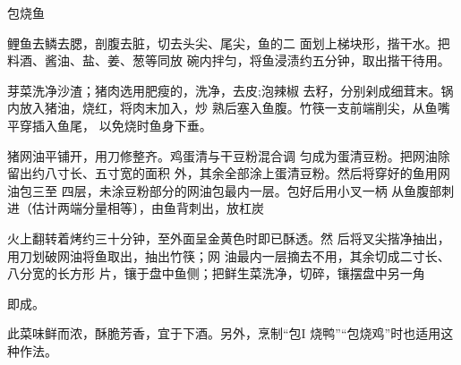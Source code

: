 \begin{recipe}{包烧鱼}

\ingredients


\cooking

\step 鲤鱼去鳞去腮，剖腹去脏，切去头尖、尾尖，鱼的二 面划上梯块形，揩干水。把料酒、酱油、盐、姜、葱等同放 碗内拌匀，将鱼浸渍约五分钟，取出揩干待用。

\step 芽菜洗净沙渣；猪肉选用肥瘦的，洗净，去皮;泡辣椒 去籽，分别剁成细茸末。锅内放入猪油，烧红，将肉末加入，炒 熟后塞入鱼腹。竹筷一支前端削尖，从鱼嘴平穿插入鱼尾， 以免烧时鱼身下垂。

猪网油平铺开，用刀修整齐。鸡蛋清与干豆粉混合调 匀成为蛋清豆粉。把网油除留出约八寸长、五寸宽的面积 外，其余全部涂上蛋清豆粉。然后将穿好的鱼用网油包三至 四层，未涂豆粉部分的网油包最内一层。包好后用小叉一柄 从鱼腹部刺进（估计两端分量相等〕，由鱼背刺出，放杠炭

火上翻转着烤约三十分钟，至外面呈金黄色时即已酥透。然 后将叉尖揩净抽出，用刀划破网油将鱼取出，抽出竹筷；网 油最内一层摘去不用，其余切成二寸长、八分宽的长方形 片，镶于盘中鱼侧；把鲜生菜洗净，切碎，镶摆盘中另一角

即成。

\notes

此菜味鲜而浓，酥脆芳香，宜于下酒。另外，烹制“包I 烧鸭”“包烧鸡”时也适用这种作法。

\end{recipe}

